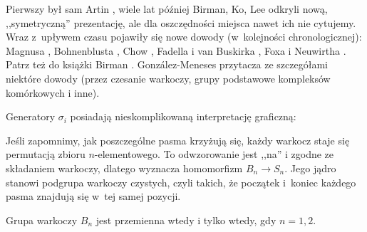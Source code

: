 Pierwszy był sam Artin \cite{artin25}, wiele lat później Birman, Ko, Lee odkryli nową, ,,symetryczną'' prezentację, ale dla oszczędności miejsca nawet ich nie cytujemy.
%
%
%
%
Wraz z~upływem czasu pojawiły się nowe dowody (w~kolejności chronologicznej): Magnusa \cite{magnus34}, Bohnenblusta \cite{bohnenblust47}, Chow \cite{chow48}, Fadella i van Buskirka \cite{fadell62}, Foxa i Neuwirtha \cite{fox62}.
%
%
%
%
%
%
%
Patrz też do książki Birman \cite{birman74}.
González-Meneses \cite{gonzalez11} przytacza ze szczegółami niektóre dowody (przez czesanie warkoczy, grupy podstawowe kompleksów komórkowych i inne).

Generatory $\sigma_i$ posiadają nieskomplikowaną interpretację graficzną:
\begin{comment}
\[
    \begin{tikzpicture}[baseline=-0.65ex, scale=0.2]
    \begin{knot}[clip width=5, end tolerance=1pt]
        \strand[semithick] (-8, -4.5) to (8, -4.5);
        \strand[semithick] [in=left,out=right] (-8, -1.5) to (8, 1.5);
        \strand[semithick] [in=left,out=right] (-8, 1.5) to (8, -1.5);
        \strand[semithick] (-8, 4.5) to (8, 4.5);
        \node at (-10, -4.5) {$1$};
        \node at (-10, -3) {$\ldots$};
        \node at (-10, -1.5) {$i$};
        \node at (-10, 1.5) {$i+1$};
        \node at (-10, 3) {$\ldots$};
        \node at (-10, 4.5) {$n$};
        \node at (0, 3) {$\ldots$};
        \node at (0, -3) {$\ldots$};
    \end{knot}
    \end{tikzpicture}
\]
\end{comment}

Jeśli zapomnimy, jak poszczególne pasma krzyżują się, każdy warkocz staje się permutacją zbioru $n$-elementowego.
To odwzorowanie jest ,,na'' i zgodne ze składaniem warkoczy, dlatego wyznacza homomorfizm $B_n \to S_n$.
%
Jego jądro stanowi podgrupa warkoczy czystych, czyli takich, że początek i~koniec każdego pasma znajdują się w~tej samej pozycji.

\begin{proposition}
    Grupa warkoczy $B_n$ jest przemienna wtedy i tylko wtedy, gdy $n = 1, 2$.
\end{proposition}

